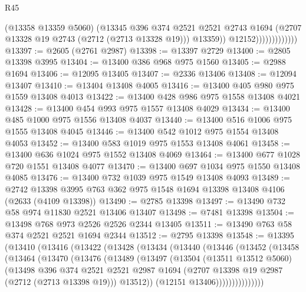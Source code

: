 \begin{lexlean}{R45}
\begin{coremodule}
                                (@13358 @13359 @5060)
                                (@13345
                                  @396
                                  @374
                                  @2521
                                  @2521
                                  @2743
                                  @1694
                                  (@2707 @13328 @19 @2743 (@2712 (@2713 @13328 @19)))
                                  @13359))
                              @12152)))))))))))))
@13397 := @2605 (@2761 @2987)
@13398 := @13397 @2729
@13400 := @2805 @13398 @3995
@13404 := @13400 @386 @968 @975 @1560
@13405 := @2988 @1694
@13406 := @12095 @13405
@13407 := @2336 @13406
@13408 := @12094 @13407
@13410 := @13404 @13408 @4005
@13416 := @13400 @405 @980 @975 @1559 @13408 @4013
@13422 := @13400 @428 @986 @975 @1558 @13408 @4021
@13428 := @13400 @454 @993 @975 @1557 @13408 @4029
@13434 := @13400 @485 @1000 @975 @1556 @13408 @4037
@13440 := @13400 @516 @1006 @975 @1555 @13408 @4045
@13446 := @13400 @542 @1012 @975 @1554 @13408 @4053
@13452 := @13400 @583 @1019 @975 @1553 @13408 @4061
@13458 := @13400 @636 @1024 @975 @1552 @13408 @4069
@13464 := @13400 @677 @1028 @720 @1551 @13408 @4077
@13470 := @13400 @697 @1034 @975 @1550 @13408 @4085
@13476 := @13400 @732 @1039 @975 @1549 @13408 @4093
@13489 := @2742 @13398 @3995 @763 @362 @975 @1548 @1694 @13398 @13408 @4106 (@2633 (@4109 @13398))
@13490 := @2785 @13398
@13497 := @13490 @732 @58 @974 @11830 @2521 @13406 @13407
@13498 := @7481 @13398
@13504 := @13498 @768 @973 @2526 @2526 @2344 @13405
@13511 := @13490 @763 @58 @374 @2521 @2521 @1694 @2344
@13512 := @2795 @13398
@13548 := @13395
    (@13410
      (@13416
        (@13422
          (@13428
            (@13434
              (@13440
                (@13446
                  (@13452
                    (@13458
                      (@13464
                        (@13470
                          (@13476
                            (@13489
                              (@13497
                                (@13504
                                  (@13511 @13512 @5060)
                                  (@13498
                                    @396
                                    @374
                                    @2521
                                    @2521
                                    @2987
                                    @1694
                                    (@2707 @13398 @19 @2987 (@2712 (@2713 @13398 @19)))
                                    @13512))
                                (@12151 @13406)))))))))))))))

\end{coremodule}
\end{lexlean}
